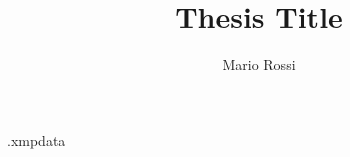 
\newcommand{\myName}{Mario Rossi}
\newcommand{\myTitle}{Thesis Title}
\newcommand{\myDegree}{Master degree thesis}
\newcommand{\myUni}{University of Padova}
\newcommand{\myFaculty}{Master degree in Computer Science}
\newcommand{\myDepartment}{Department of Mathematics ``Tullio Levi-Civita''}
\newcommand{\profTitle}{Prof.}
\newcommand{\myProf}{Prof 1}
\newcommand{\myCoProf}{Prof 2}
\newcommand{\myLocation}{Padova}
\newcommand{\myAA}{2023--2024}
\newcommand{\myTime}{April}

\title{\myTitle}
\author{\myName}

\begin{filecontents*}{\jobname.xmpdata}
\end{filecontents*}


